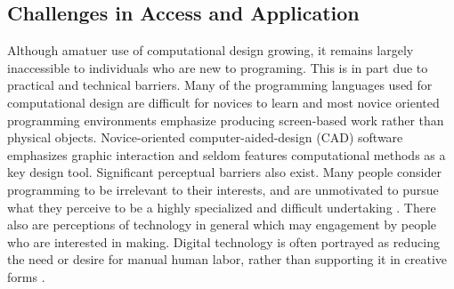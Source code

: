 \documentclass{sigchi}
\begin{document}
\subsection{Challenges in Access and Application}
Although amatuer use of computational design growing, it remains largely inaccessible to individuals who are new to programing. This is in part due to practical and technical barriers. Many of the programming languages used for computational design are difficult for novices to learn and most novice oriented programming environments emphasize producing screen-based work rather than physical objects. Novice-oriented computer-aided-design (CAD) software emphasizes graphic interaction and seldom features computational methods as a key design tool. Significant perceptual barriers also exist. Many people consider programming to be irrelevant to their interests, and are unmotivated to pursue what they perceive to be a highly specialized and difficult undertaking \cite{resnick1}. There also are perceptions of technology in general which may engagement by people who are interested in making. Digital technology is often portrayed as reducing the need or desire for manual human labor, rather than supporting it in creative forms \cite{rosner_craft_vs_design}.
\end{document}
